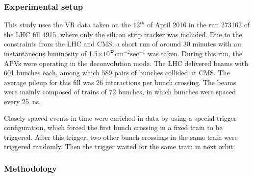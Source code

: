\subsubsection{Experimental setup} 

This study uses the VR data taken on the $12^{th}$ of April 2016 in the run 273162 of the LHC fill 4915, where only the silicon strip tracker was included. Due to the constraints from the LHC and CMS, a short run of around 30 minutes with an instantaneous luminosity of 1.5$\times 10^{33} \mathrm{cm^{-2} sec^{-1}}$ was taken. During this run, the APVs were operating in the deconvolution mode. The LHC delivered beams with 601 bunches each, among which 589 pairs of bunches collided at CMS. The average pileup for this fill was 26 interactions per bunch crossing. The beams were mainly composed of trains of 72 bunches, in which bunches were spaced every 25~ns.

Closely spaced events in time were enriched in data by using a special trigger configuration, which forced the first bunch crossing in a fixed train to be triggered. After this trigger, two other bunch crossings in the same train were triggered randomly. Then the trigger waited for the same train in next orbit. 





 \subsubsection{Methodology}
 

